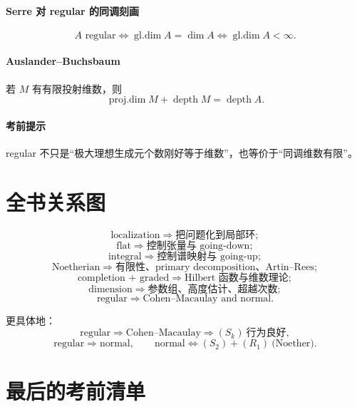 \documentclass[a4paper]{ctexart}
\begin{document}
\paragraph{Serre 对 regular 的同调刻画}
\[
A \text{ regular}
\Longleftrightarrow
\operatorname{gl.dim}A=\dim A
\Longleftrightarrow
\operatorname{gl.dim}A<\infty.
\]

\paragraph{Auslander--Buchsbaum}
若 \(M\) 有有限投射维数，则
\[
\operatorname{proj.dim}M+\operatorname{depth}M=\operatorname{depth}A.
\]

\paragraph{考前提示}
regular 不只是“极大理想生成元个数刚好等于维数”，也等价于“同调维数有限”。

\section*{全书关系图}
{}

\[
\text{localization} \Rightarrow \text{把问题化到局部环};
\]
\[
\text{flat} \Rightarrow \text{控制张量与 going-down};
\]
\[
\text{integral} \Rightarrow \text{控制谱映射与 going-up};
\]
\[
\text{Noetherian} \Rightarrow \text{有限性、primary decomposition、Artin--Rees};
\]
\[
\text{completion + graded} \Rightarrow \text{Hilbert 函数与维数理论};
\]
\[
\text{dimension} \Rightarrow \text{参数组、高度估计、超越次数};
\]
\[
\text{regular} \Rightarrow \text{Cohen--Macaulay and normal}.
\]

更具体地：
\[
\text{regular} \Rightarrow \text{Cohen--Macaulay} \Rightarrow (S_k)\ \text{行为良好},
\]
\[
\text{regular} \Rightarrow \text{normal},
\qquad
\text{normal} \Longleftrightarrow (S_2)+(R_1)\ \text{(Noether)}.
\]

\section*{最后的考前清单}
{}
\end{document}
